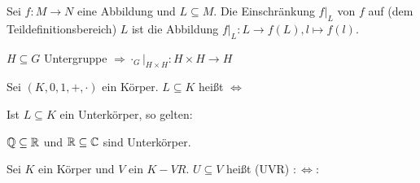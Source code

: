 \begin{nota}
	Sei $f:M\rightarrow N$ eine Abbildung und $L\subseteq M$. Die Einschränkung $f|_{L}$ von $f$ auf (dem Teildefinitionsbereich) $L$ ist die Abbildung $f|_{L}:L\rightarrow f(L),l\mapsto f(l)$.
\end{nota}

\begin{bsp}
	$H\subseteq G$ Untergruppe $\Rightarrow \cdot_{G}|_{H\times H}:H\times H\rightarrow H$
\end{bsp}

\begin{defi}
	Sei $(K,0,1,+,\cdot)$ ein Körper. $L\subseteq K$ heißt  $\Leftrightarrow$
\end{defi}

\begin{prop}
	Ist $L\subseteq K$ ein Unterkörper, so gelten:
\end{prop}

\begin{bew}
\end{bew}

\begin{bsp}
	$\mathbb{Q}\subseteq\mathbb{R}$ und $\mathbb{R}\subseteq\mathbb{C}$ sind Unterkörper.
\end{bsp}

\begin{defi}
	Sei $K$ ein Körper und $V$ ein $K-VR$. $U\subseteq V$ heißt  (UVR) $:\Leftrightarrow$:
\end{defi}

